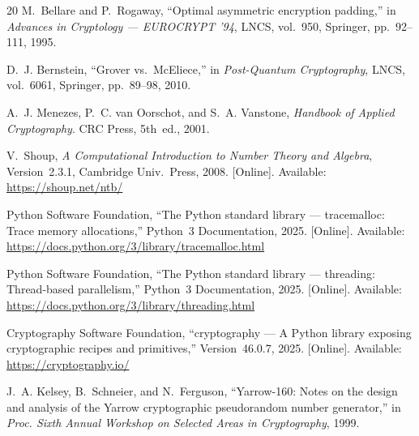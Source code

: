 \documentclass[conference]{IEEEtran}
\begin{document}
\begin{thebibliography}{20}
M.~Bellare and P.~Rogaway, ``Optimal asymmetric encryption padding,'' in \textit{Advances in Cryptology --- EUROCRYPT '94}, LNCS, vol.~950, Springer, pp.~92--111, 1995.

D.~J. Bernstein, ``Grover vs.\ McEliece,'' in \textit{Post-Quantum Cryptography}, LNCS, vol.~6061, Springer, pp.~89--98, 2010.

A.~J. Menezes, P.~C. van Oorschot, and S.~A. Vanstone, \textit{Handbook of Applied Cryptography}. CRC Press, 5th~ed., 2001.

V.~Shoup, \textit{A Computational Introduction to Number Theory and Algebra}, Version~2.3.1, Cambridge Univ.\ Press, 2008. [Online]. Available: \url{https://shoup.net/ntb/}

Python Software Foundation, ``The Python standard library --- tracemalloc: Trace memory allocations,'' Python~3 Documentation, 2025. [Online]. Available: \url{https://docs.python.org/3/library/tracemalloc.html}

Python Software Foundation, ``The Python standard library --- threading: Thread-based parallelism,'' Python~3 Documentation, 2025. [Online]. Available: \url{https://docs.python.org/3/library/threading.html}

Cryptography Software Foundation, ``cryptography --- A Python library exposing cryptographic recipes and primitives,'' Version~46.0.7, 2025. [Online]. Available: \url{https://cryptography.io/}

J.~A. Kelsey, B.~Schneier, and N.~Ferguson, ``Yarrow-160: Notes on the design and analysis of the Yarrow cryptographic pseudorandom number generator,'' in \textit{Proc. Sixth Annual Workshop on Selected Areas in Cryptography}, 1999.

\end{thebibliography}
\end{document}
